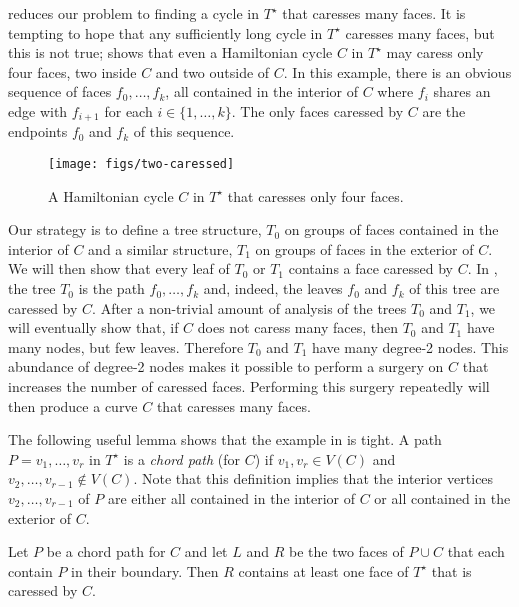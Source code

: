 \documentclass{patmorin}
\newcommand{\dual}[1]{{#1}^\star}
\begin{document}
 reduces our problem to finding a cycle in
$\dual{T}$ that caresses many faces.  It is tempting to hope that
any sufficiently long cycle in $\dual{T}$ caresses many faces, but
this is not true;  shows that even a Hamiltonian
cycle $C$ in $\dual{T}$ may caress only four faces, two inside $C$ and
two outside of $C$.  In this example, there is an obvious sequence of
faces $f_0,\ldots,f_k$, all contained in the interior of $C$ where $f_i$
shares an edge with $f_{i+1}$ for each $i\in\{1,\ldots,k\}$.  The only
faces caressed by $C$ are the endpoints $f_0$ and $f_k$ of this sequence.

\begin{figure}
   \begin{center}
       \texttt{[image: figs/two-caressed]}
   \end{center}
   \caption{A Hamiltonian cycle $C$ in $\dual{T}$ that caresses only four faces.}
\end{figure}

Our strategy is to define a tree structure, $T_0$ on groups of faces
contained in the interior of $C$ and a similar structure, $T_1$ on groups
of faces in the exterior of $C$.  We will then show that every leaf of
$T_0$ or $T_1$ contains a face caressed by $C$. In ,
the tree $T_0$ is the path $f_0,\ldots,f_k$ and, indeed, the leaves $f_0$
and $f_k$ of this tree are caressed by $C$.  After a non-trivial amount
of analysis of the trees $T_0$ and $T_1$, we will eventually show that,
if $C$ does not caress many faces, then $T_0$ and $T_1$ have many nodes,
but few leaves.  Therefore $T_0$ and $T_1$ have many degree-2 nodes.
This abundance of degree-2 nodes makes it possible to perform a surgery
on $C$ that increases the number of caressed faces.  Performing this
surgery repeatedly will then produce a curve $C$ that caresses many faces.

The following useful lemma shows that the example in 
is tight.  A path $P=v_1,\ldots,v_r$ in $\dual{T}$ is a \emph{chord
path} (for $C$) if $v_1,v_r\in V(C)$ and $v_2,\ldots,v_{r-1}\not\in
V(C)$.  Note that this definition implies that the interior vertices
$v_2,\ldots,v_{r-1}$ of $P$ are either all contained in the interior of
$C$ or all contained in the exterior of $C$.

\begin{lem}
   Let $P$ be a chord path for $C$ and let $L$ and $R$ be the two faces
   of $P\cup C$ that each contain $P$ in their boundary. Then $R$
   contains at least one face of $\dual{T}$ that is caressed by $C$.
\end{lem}
\end{document}
